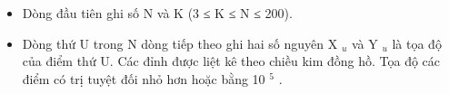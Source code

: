 \begin{itemize}
	\item     Dòng đầu tiên ghi số N và K (3 ≤ K ≤ N ≤ 200).   
	\item     Dòng thứ U trong N dòng tiếp theo ghi hai số nguyên X    $_     u    $    và Y    $_     u    $    là tọa độ của điểm thứ U. Các đỉnh được liệt kê theo chiều kim đồng hồ. Tọa độ các điểm có trị tuyệt đối nhỏ hơn hoặc bằng 10    $^     5    $    .   
\end{itemize}

\